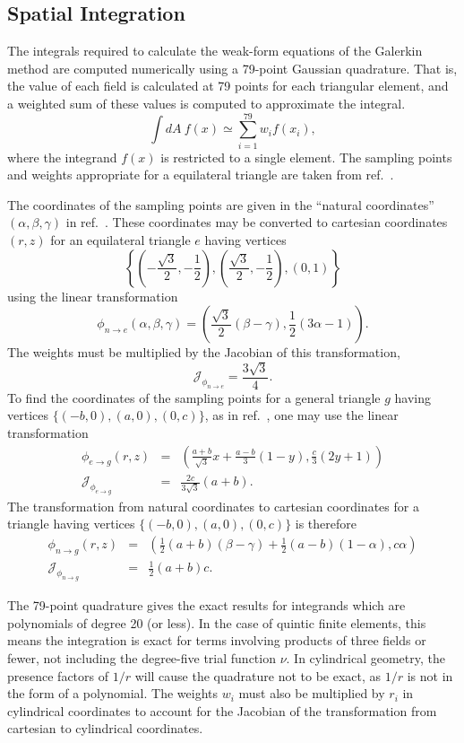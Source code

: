 \documentclass[letterpaper]{book}
\begin{document}
\subsection{Spatial Integration}

The integrals required to calculate the weak-form equations of the
Galerkin method are computed numerically using a 79-point Gaussian
quadrature.  That is, the value of each field is calculated at 79
points for each triangular element, and a weighted sum of these values
is computed to approximate the integral.
\[
  \int dA\ f(x) \simeq \sum_{i=1}^{79} w_i f(x_i),
\]
where the integrand $f(x)$ is restricted to a single element.  The
sampling points and weights appropriate for a equilateral triangle are
taken from ref.~\cite{Dunavant85}.

The coordinates of the sampling points are given in the ``natural
coordinates'' $(\alpha, \beta, \gamma)$ in ref.~\cite{Dunavant85}.
These coordinates may be converted to cartesian coordinates $(r, z)$
for an equilateral triangle $e$ having vertices
\[
\left\{\left(-\frac{\sqrt{3}}{2},-\frac{1}{2}\right),
\left(\frac{\sqrt{3}}{2},-\frac{1}{2}\right), (0,1)\right\} 
\]
using the linear transformation
\[ 
\phi_{n \to e}(\alpha, \beta, \gamma) = 
\left(\frac{\sqrt{3}}{2}(\beta-\gamma), \frac{1}{2}(3 \alpha - 1)
\right).
\]
The weights must be multiplied by the Jacobian of this transformation,
\[
\mathcal{J}_{\phi_{n \to e}} = \frac{3 \sqrt{3}}{4}.
\]
To find the coordinates of the sampling points for a general triangle
$g$ having vertices $\{(-b,0), (a,0), (0,c)\}$, as in
ref.~\cite{Jardin04}, one may use the linear transformation
\begin{eqnarray*}
  \phi_{e \to g}(r,z) & = & 
    \left(\frac{a+b}{\sqrt{3}} x + \frac{a-b}{3} (1-y), 
    \frac{c}{3}(2y+1) \right) \\
  \mathcal{J}_{\phi_{e \to g}} & = &  \frac{2 c}{3 \sqrt{3}} (a+b).
\end{eqnarray*}
The transformation from natural coordinates to cartesian coordinates
for a triangle having vertices $\{(-b,0), (a,0), (0,c)\}$ is therefore
\begin{eqnarray*}
  \phi_{n \to g}(r,z) & = & 
  \left(\frac{1}{2} (a+b) (\beta-\gamma) +
  \frac{1}{2} (a-b)(1-\alpha), c \alpha \right) \\
  \mathcal{J}_{\phi_{n \to g}} & = & \frac{1}{2} (a+b) c.
\end{eqnarray*}

The 79-point quadrature gives the exact results for integrands which
are polynomials of degree 20 (or less).  In the case of quintic finite
elements, this means the integration is exact for terms involving
products of three fields or fewer, not including the degree-five
trial function $\nu$.  In cylindrical geometry, the presence factors
of $1/r$ will cause the quadrature not to be exact, as $1/r$ is not in
the form of a polynomial.  The weights $w_i$ must also be multiplied
by $r_i$ in cylindrical coordinates to account for the Jacobian of the
transformation from cartesian to cylindrical coordinates.
\end{document}

